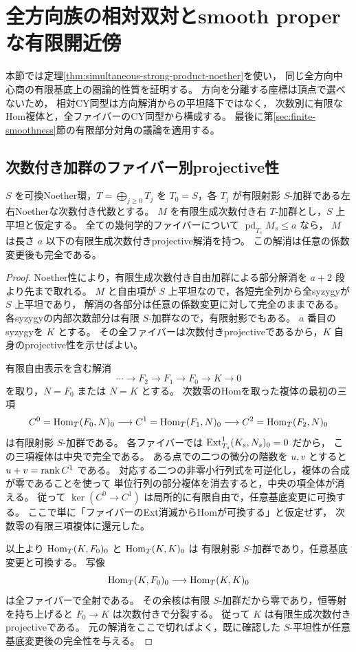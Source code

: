 \section{全方向族の相対双対とsmooth properな有限開近傍}
\label{sec:simultaneous-relative-geometry}

本節では定理\ref{thm:simultaneous-strong-product-noether}を使い，
同じ全方向中心商の有限基底上の圏論的性質を証明する。
方向を分離する座標は頂点で選べないため，
相対CY同型は方向解消からの平坦降下ではなく，
次数別に有限なHom複体と，全ファイバーのCY同型から構成する。
最後に第\ref{sec:finite-smoothness}節の有限部分対角の議論を適用する。

\subsection{次数付き加群のファイバー別projective性}

\begin{lemma}\label{lem:graded-fiberwise-projective}
$S$ を可換Noether環，$T=\bigoplus_{j\ge0}T_j$ を
$T_0=S$，各 $T_j$ が有限射影 $S$-加群である左右Noetherな次数付き代数とする。
$M$ を有限生成次数付き右 $T$-加群とし，$S$ 上平坦と仮定する。
全ての幾何学的ファイバーについて
$\operatorname{pd}_{T_s}M_s\le a$ なら，
$M$ は長さ $a$ 以下の有限生成次数付きprojective解消を持つ。
この解消は任意の係数変更後も完全である。
\end{lemma}
\begin{proof}
Noether性により，有限生成次数付き自由加群による部分解消を
$a+2$ 段より先まで取れる。
$M$ と自由項が $S$ 上平坦なので，各短完全列から全syzygyが $S$ 上平坦であり，
解消の各部分は任意の係数変更に対して完全のままである。
各syzygyの内部次数部分は有限 $S$-加群なので，有限射影でもある。
$a$ 番目のsyzygyを $K$ とする。
その全ファイバーは次数付きprojectiveであるから，$K$ 自身のprojective性を示せばよい。

有限自由表示を含む解消
\[
 \cdots\longrightarrow F_2\longrightarrow F_1
       \longrightarrow F_0\longrightarrow K\longrightarrow0
\]
を取り，$N=F_0$ または $N=K$ とする。
次数零のHomを取った複体の最初の三項
\[
 C^0=\operatorname{Hom}_T(F_0,N)_0\longrightarrow
 C^1=\operatorname{Hom}_T(F_1,N)_0\longrightarrow
 C^2=\operatorname{Hom}_T(F_2,N)_0
\]
は有限射影 $S$-加群である。
各ファイバーでは $\operatorname{Ext}^1_{T_s}(K_s,N_s)_0=0$ だから，
この三項複体は中央で完全である。
ある点での二つの微分の階数を $u,v$ とすると
$u+v=\operatorname{rank} C^1$ である。
対応する二つの非零小行列式を可逆化し，複体の合成が零であることを使って
単位行列の部分複体を消去すると，中央の項全体が消える。
従って $\ker(C^0\to C^1)$ は局所的に有限自由で，任意基底変更に可換する。
ここで単に「ファイバーのExt消滅からHomが可換する」と仮定せず，
次数零の有限三項複体に還元した。

以上より $\operatorname{Hom}_T(K,F_0)_0$ と $\operatorname{Hom}_T(K,K)_0$ は
有限射影 $S$-加群であり，任意基底変更と可換する。
写像
\[
 \operatorname{Hom}_T(K,F_0)_0\longrightarrow\operatorname{Hom}_T(K,K)_0
\]
は全ファイバーで全射である。
その余核は有限 $S$-加群だから零であり，恒等射を持ち上げると
$F_0\to K$ は次数付きで分裂する。
従って $K$ は有限生成次数付きprojectiveである。
元の解消をここで切ればよく，既に確認した $S$-平坦性が任意基底変更後の完全性を与える。
\end{proof}

